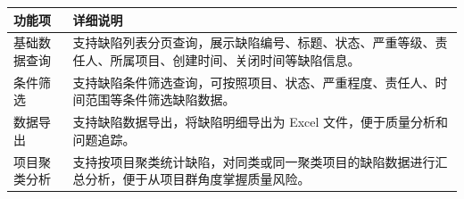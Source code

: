 \begin{enumerate}[label=(\arabic*)]
	
	\begin{center}
		\label{tab:bug_query}
		{\songti{}\selectfont\fontsize{10.5pt}{12.6pt}\selectfont
			\begin{tabular}{p{3.5cm} p{10.5cm}}
				\toprule
				\textbf{功能项} & \textbf{详细说明} \\
				\midrule
				基础数据查询 & 支持缺陷列表分页查询，展示缺陷编号、标题、状态、严重等级、责任人、所属项目、创建时间、关闭时间等缺陷信息。 \\
				条件筛选 & 支持缺陷条件筛选查询，可按照项目、状态、严重程度、责任人、时间范围等条件筛选缺陷数据。 \\
				数据导出 & 支持缺陷数据导出，将缺陷明细导出为 Excel 文件，便于质量分析和问题追踪。 \\
				项目聚类分析 & 支持按项目聚类统计缺陷，对同类或同一聚类项目的缺陷数据进行汇总分析，便于从项目群角度掌握质量风险。 \\
				\bottomrule
			\end{tabular}
		}
	\end{center}
	

\end{enumerate}
